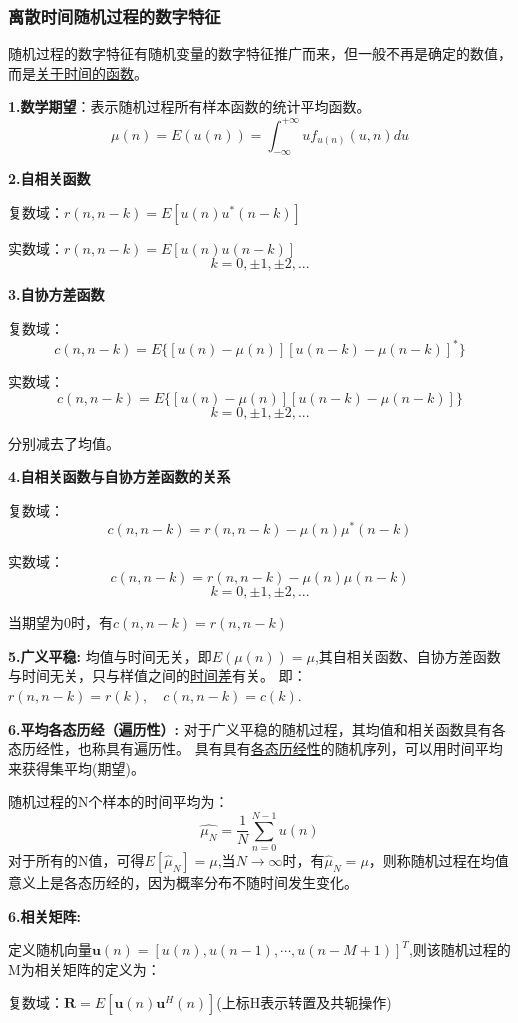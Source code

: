 \documentclass[UTF8]{ctexart} %
\begin{document}
			\subsubsection{离散时间随机过程的数字特征}		
				随机过程的数字特征有随机变量的数字特征推广而来，但一般不再是确定的数值，而是\uline{关于时间的函数}。
				
				\textbf{1.数学期望}：表示随机过程所有样本函数的统计平均函数。
				\[\mu(n)=E(u(n))=\int_{-\infty}^{+\infty}uf_{u(n)}(u,n)du\]
				
				\textbf{2.自相关函数}
				
				复数域：$r(n,n-k) = E[u(n)u^*(n-k)]$	
					
				实数域：$r(n,n-k) = E[u(n)u(n-k)]$
				\[k=0,\pm1,\pm2,...\]
				
				\textbf{3.自协方差函数}
				
				复数域：
				\[c(n,n-k) = E\{[u(n)-\mu(n)][u(n-k)-\mu(n-k)]^*\}\]	
				
				实数域：
				\[c(n,n-k) = E\{[u(n)-\mu(n)][u(n-k)-\mu(n-k)]\}\]				
				\[k=0,\pm1,\pm2,...\]
				
				分别减去了均值。
				
				\textbf{4.自相关函数与自协方差函数的关系}
				
				复数域：
				\[c(n,n-k) = r(n,n-k)-\mu(n)\mu^*(n-k)\]	
				
				实数域：
				\[c(n,n-k) =r(n,n-k)-\mu(n)\mu(n-k)\]				
				\[k=0,\pm1,\pm2,...\]
				
				当期望为0时，有$c(n,n-k) =r(n,n-k)$
				
				\textbf{5.广义平稳:}
				均值与时间无关，即$E(\mu(n))=\mu$,其自相关函数、自协方差函数与时间无关，只与样值之间的\uline{时间差}有关。
				即：$r(n,n-k)=r(k),\quad c(n,n-k)=c(k)$.
				
				\textbf{6.平均各态历经（遍历性）:}
				对于广义平稳的随机过程，其均值和相关函数具有各态历经性，也称具有遍历性。
				具有具有\uline{各态历经性}的随机序列，可以用时间平均来获得集平均(期望)。
				
				随机过程的N个样本的时间平均为：
				\[\hat{\mu_N}=\frac{1}{N}\sum_{n=0}^{N-1}u(n)\]
				对于所有的N值，可得$E[\hat{\mu}_N]=\mu$,当$N\rightarrow \infty$时，有$\hat{\mu}_N=\mu$，则称随机过程在均值意义上是各态历经的，因为概率分布不随时间发生变化。
				
				\textbf{6.相关矩阵:}
				
				定义随机向量$\textbf{u}(n)=[u(n),u(n-1),\cdots,u(n-M+1)]^T$,则该随机过程的M为相关矩阵的定义为：
				
				复数域：$\textbf{R}=E[\textbf{u}(n)\textbf{u}^H(n)]$\quad(上标H表示转置及共轭操作)
				
\end{document}
